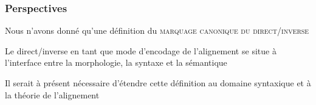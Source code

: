 \begin{frame}
\frametitle{Perspectives}
\begin{wideitemize}%
\item[\highlighti{\danger}] Nous n'avons donné qu'une définition du
  \textsc{marquage canonique du direct/inverse}
\item Le direct/inverse en tant que mode d'encodage de l'alignement se
  situe à l'interface entre la morphologie, la syntaxe et la sémantique
\item Il serait à présent nécessaire d'étendre cette définition au
  domaine syntaxique et à la théorie de l'alignement
\end{wideitemize}
\end{frame}




